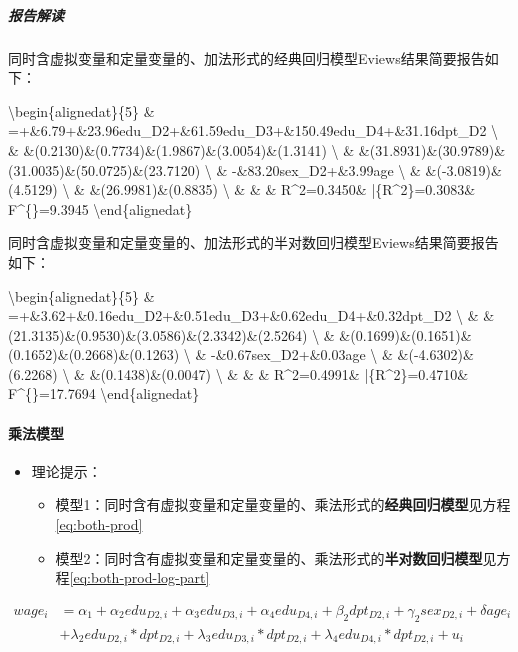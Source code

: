 \documentclass[12pt,(landscape,a4paper),(portrait,a4paper)]{article}
\providecommand{\tightlist}{%
  \setlength{\itemsep}{0pt}\setlength{\parskip}{0pt}}
\let\oldparagraph\paragraph
\renewcommand{\paragraph}[1]{\oldparagraph{#1}\mbox{}}
\let\oldsubparagraph\subparagraph
\renewcommand{\subparagraph}[1]{\oldsubparagraph{#1}\mbox{}}
\theoremstyle{definition}
\theoremstyle{definition}
\theoremstyle{definition}
\theoremstyle{remark}
\begin{document}
\hypertarget{-2}{%
\subparagraph{报告解读}\label{-2}}

同时含虚拟变量和定量变量的、加法形式的经典回归模型Eviews结果简要报告如下：

\textbackslash{}begin\{alignedat\}\{5\} \&
=+\&6.79+\&23.96edu\_D2+\&61.59edu\_D3+\&150.49edu\_D4+\&31.16dpt\_D2
\textbackslash{} \&
\&(0.2130)\&(0.7734)\&(1.9867)\&(3.0054)\&(1.3141)
\textbackslash{} \&
\&(31.8931)\&(30.9789)\&(31.0035)\&(50.0725)\&(23.7120)
\textbackslash{} \& \quad-\&83.20sex\_D2+\&3.99age \textbackslash{} \&
\&(-3.0819)\&(4.5129) \textbackslash{} \&
\&(26.9981)\&(0.8835) \textbackslash{} \& \&
\quad\& R\^{}2=0.3450\& \bar\{R\^{}2\}=0.3083\& F\^{}\{\ast\}=9.3945
\textbackslash{}end\{alignedat\}

同时含虚拟变量和定量变量的、加法形式的半对数回归模型Eviews结果简要报告如下：

\textbackslash{}begin\{alignedat\}\{5\} \&
=+\&3.62+\&0.16edu\_D2+\&0.51edu\_D3+\&0.62edu\_D4+\&0.32dpt\_D2
\textbackslash{} \&
\&(21.3135)\&(0.9530)\&(3.0586)\&(2.3342)\&(2.5264)
\textbackslash{} \&
\&(0.1699)\&(0.1651)\&(0.1652)\&(0.2668)\&(0.1263)
\textbackslash{} \& \quad-\&0.67sex\_D2+\&0.03age \textbackslash{} \&
\&(-4.6302)\&(6.2268) \textbackslash{} \&
\&(0.1438)\&(0.0047) \textbackslash{} \& \&
\quad\& R\^{}2=0.4991\& \bar\{R\^{}2\}=0.4710\& F\^{}\{\ast\}=17.7694
\textbackslash{}end\{alignedat\}

\hypertarget{-1}{%
\paragraph{乘法模型}\label{-1}}

\begin{itemize}
\tightlist
\item
  理论提示：

  \begin{itemize}
  \tightlist
  \item
    模型1：同时含有虚拟变量和定量变量的、乘法形式的\textbf{经典回归模型}见方程\eqref{eq:both-prod}
  \item
    模型2：同时含有虚拟变量和定量变量的、乘法形式的\textbf{半对数回归模型}见方程\eqref{eq:both-prod-log-part}
  \end{itemize}
\end{itemize}

\[\begin{equation}
\begin{split}
wage_i & =\alpha_1+\alpha_2edu_{D2,i}+\alpha_3edu_{D3,i}+\alpha_4edu_{D4,i}+\beta_2 dpt_{D2,i}+\gamma_2sex_{D2,i}+\delta age_i
\\ & +\lambda_2edu_{D2,i} \ast dpt_{D2,i}+\lambda_3edu_{D3,i}\ast dpt_{D2,i}+\lambda_4edu_{D4,i}\ast dpt_{D2,i}  +u_i  
\end{split}
\label{eq:both-prod} 
\end{equation}\]
\end{document}
